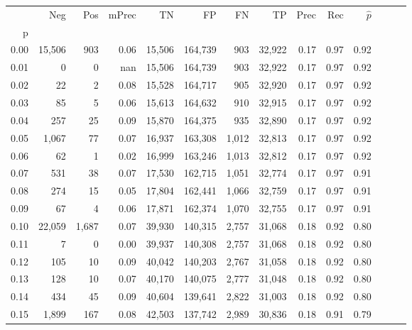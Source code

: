 \begin{tabular}{rrrrrrrrrrrrrr}
\toprule
{} &     Neg &    Pos & mPrec &       TN &       FP &      FN &      TP &  Prec &   Rec & $\hat{p}$ \\
p    &         &        &       &          &          &         &         &       &       &           \\
\midrule
0.00 &  15,506 &    903 &  0.06 &   15,506 &  164,739 &     903 &  32,922 &  0.17 &  0.97 &      0.92 \\
0.01 &       0 &      0 &   nan &   15,506 &  164,739 &     903 &  32,922 &  0.17 &  0.97 &      0.92 \\
0.02 &      22 &      2 &  0.08 &   15,528 &  164,717 &     905 &  32,920 &  0.17 &  0.97 &      0.92 \\
0.03 &      85 &      5 &  0.06 &   15,613 &  164,632 &     910 &  32,915 &  0.17 &  0.97 &      0.92 \\
0.04 &     257 &     25 &  0.09 &   15,870 &  164,375 &     935 &  32,890 &  0.17 &  0.97 &      0.92 \\
0.05 &   1,067 &     77 &  0.07 &   16,937 &  163,308 &   1,012 &  32,813 &  0.17 &  0.97 &      0.92 \\
0.06 &      62 &      1 &  0.02 &   16,999 &  163,246 &   1,013 &  32,812 &  0.17 &  0.97 &      0.92 \\
0.07 &     531 &     38 &  0.07 &   17,530 &  162,715 &   1,051 &  32,774 &  0.17 &  0.97 &      0.91 \\
0.08 &     274 &     15 &  0.05 &   17,804 &  162,441 &   1,066 &  32,759 &  0.17 &  0.97 &      0.91 \\
0.09 &      67 &      4 &  0.06 &   17,871 &  162,374 &   1,070 &  32,755 &  0.17 &  0.97 &      0.91 \\
0.10 &  22,059 &  1,687 &  0.07 &   39,930 &  140,315 &   2,757 &  31,068 &  0.18 &  0.92 &      0.80 \\
0.11 &       7 &      0 &  0.00 &   39,937 &  140,308 &   2,757 &  31,068 &  0.18 &  0.92 &      0.80 \\
0.12 &     105 &     10 &  0.09 &   40,042 &  140,203 &   2,767 &  31,058 &  0.18 &  0.92 &      0.80 \\
0.13 &     128 &     10 &  0.07 &   40,170 &  140,075 &   2,777 &  31,048 &  0.18 &  0.92 &      0.80 \\
0.14 &     434 &     45 &  0.09 &   40,604 &  139,641 &   2,822 &  31,003 &  0.18 &  0.92 &      0.80 \\
0.15 &   1,899 &    167 &  0.08 &   42,503 &  137,742 &   2,989 &  30,836 &  0.18 &  0.91 &      0.79 \\

\end{tabular}

